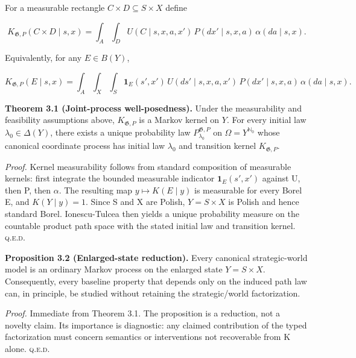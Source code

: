 \documentclass[10pt]{article}
\begin{document}
For a measurable rectangle \(C\times{}D\subseteq{}S\times{}X\) define

\begin{equation}
K_{\mathfrak G,P}(C\times D\mid s,x)=\int_A\!\int_D U(C\mid s,x,a,x')\,P(dx'\mid s,x,a)\,\alpha(da\mid s,x).
\tag{5}\label{eq:5}
\end{equation}

Equivalently, for any \(E\in{}B(Y)\),

\begin{equation}
K_{\mathfrak G,P}(E\mid s,x)=\int_A\!\int_X\!\int_S \mathbf 1_E(s',x')\,U(ds'\mid s,x,a,x')\,P(dx'\mid s,x,a)\,\alpha(da\mid s,x).
\tag{6}\label{eq:6}
\end{equation}

\textbf{Theorem 3.1 (Joint-process well-posedness).} Under the
measurability and feasibility assumptions above, \(K_{\mathfrak G,P}\)
is a Markov kernel on \(Y\). For every initial law
\(\lambda_0\in{}\Delta(Y)\), there exists a unique probability law
\(P^{\mathfrak G,P}_{\lambda_0}\) on \(\Omega=Y^{\mathbb N_0}\) whose
canonical coordinate process has initial law \(\lambda_0\) and
transition kernel \(K_{\mathfrak G,P}\).

\emph{Proof.} Kernel measurability follows from standard composition of
measurable kernels: first integrate the bounded measurable indicator
\(\mathbf 1_E(s',x')\) against U, then P, then \(\alpha\). The resulting
map \(y\mapsto{}K(E\mid y)\) is measurable for every Borel E, and
\(K(Y\mid y)=1\). Since S and X are Polish, \(Y=S\times{}X\) is Polish
and hence standard Borel. Ionescu-Tulcea then yields a unique
probability measure on the countable product path space with the stated
initial law and transition kernel. \hfill\textsc{q.e.d.}

\textbf{Proposition 3.2 (Enlarged-state reduction).} Every canonical
strategic-world model is an ordinary Markov process on the enlarged
state \(Y=S\times{}X\). Consequently, every baseline property that
depends only on the induced path law can, in principle, be studied
without retaining the strategic/world factorization.

\emph{Proof.} Immediate from Theorem 3.1. The proposition is a
reduction, not a novelty claim. Its importance is diagnostic: any
claimed contribution of the typed factorization must concern semantics
or interventions not recoverable from K alone. \hfill\textsc{q.e.d.}
\end{document}

